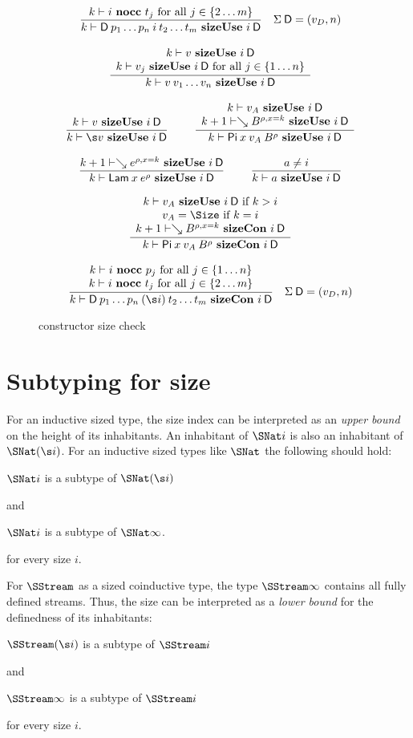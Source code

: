 \begin{figure}[htp]
\begin{gather*}
\nru{}
{\nocc{k}{i}{t_j} \mbox { for all } j \in \{ 2 \ldots m\}}
{\sizeuse{k}{\DD \: p_1 \ldots p_n \: i \: t_2 \ldots t_m}{i}{\DD}}
{\quad \Sig \: \DD = (v_D,n)}
\\[2ex]
\ndru{}
{\sizeuse{k}{v}{i}{\DD}}
{\sizeuse{k}{v_j}{i}{\DD} \mbox { for all } j \in \{ 1 \ldots n\}}
{\sizeuse{k}{v \: v_1 \ldots v_n}{i}{\DD}}
\\[2ex]
\nru{}
{\sizeuse{k}{v}{i}{\DD}}
{\sizeuse{k}{\s v}{i}{\DD}}
\qquad
\ndru{}
{\sizeuse{k}{v_A}{i}{\DD}}
{\sizeuse{k+1}{\wh \cl{B}{\ins{\rho}{x}{k}}}{i}{\DD}}
{\sizeuse{k}{\vpi \: x \: v_A \: \cl{B}{\rho}}{i}{\DD}}
\\[2ex]
\nru{}
{\sizeuse{k+1}{\wh \cl{e}{\ins{\rho}{x}{k}}}{i}{\DD}}
{\sizeuse{k}{\vlam \: x \: \cl{e}{\rho}}{i}{\DD}}
\qquad
\nru{}
{a \neq i}
{\sizeuse{k}{a}{i}{\DD}}
\\[2ex]
\nxru{}
{\sizeuse{k}{v_A}{i}{\DD} \mbox{ if } k > i}
{v_A = \Size \mbox { if } k = i }
{\sizecon{k+1}{\wh \cl{B}{\ins{\rho}{x}{k}}}{i}{\DD}}
{\sizecon{k}{\vpi \: x \: v_A \: \cl{B}{\rho}}{i}{\DD}}
\\[2ex]
\ndru{}
{\nocc{k}{i}{p_j} \mbox { for all } j \in \{ 1 \ldots n\}}
{\nocc{k}{i}{t_j} \mbox { for all } j \in \{ 2 \ldots m\}}
{\sizecon{k}{\DD \:p_1 \ldots p_n \: (\s i) \:t_2 \ldots t_m}{i}{\DD}}
{\quad \Sig \: \DD = (v_D,n)}
\end{gather*}
\caption{constructor size check}
\label{fsizecon}
\end{figure}


\section{Subtyping for size}

For an inductive sized type, the size index can be interpreted as an \emph{upper bound} on the height of its inhabitants.
An inhabitant of $\SNat i$ is also an inhabitant of $\SNat (\s i)$. For an inductive sized types like $\SNat$ the following should hold:
\begin{bsp}
$\SNat i$ is a subtype of $\SNat (\s i)$  
\end{bsp}
and
\begin{bsp}
$\SNat i$ is a subtype of $\SNat \infty$.
\end{bsp}
for every size $i$.

For $\SStream$ as a sized coinductive type, the type $\SStream \infty$ contains all fully defined streams.
Thus, the size can be interpreted as a \emph{lower bound} for the definedness of its inhabitants:
\begin{bsp}
$\SStream (\s i) $ is a subtype of $\SStream i$
\end{bsp}
and
\begin{bsp}
$\SStream \infty$ is a subtype of $\SStream i$
\end{bsp}
for every size $i$.




